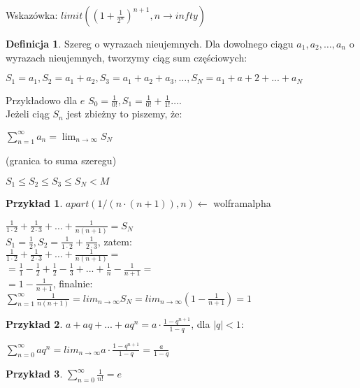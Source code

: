\documentclass{article}
\theoremstyle{definition}
\newtheorem{de}{Definicja}[subsection]
\theoremstyle{definition}
\theoremstyle{definition}
\newtheorem{pk}{Przykład}[subsection]
\theoremstyle{definition}
\begin{document}
Wskazówka: $limit\left((1+\frac{1}{2^n})^{n+1},n\rightarrow infty\right)$

\begin{de}
Szereg o wyrazach nieujemnych. Dla dowolnego ciągu $a_1, a_2, \dots, a_n$ o wyrazach nieujemnych,
tworzymy ciąg sum częściowych:
\begin{center}
$S_1=a_1, S_2=a_1+a_2, S_3=a_1+a_2+a_3, \dots, S_N=a_1+a+2+...+a_N$
\end{center}

Przykładowo dla $e$ $S_0=\frac{1}{0!}, S_1=\frac{1}{0!}+\frac{1}{1!}\dots$.\\
Jeżeli ciąg $S_n$ jest zbieżny to piszemy, że:
\begin{center}
$\sum_{n=1}^{\infty} a_n = \lim_{n\rightarrow \infty} S_N$
\end{center}
(granica to suma szeregu)
\begin{center}
    $S_1\leq S_2\leq S_3\leq S_N < M$
\end{center}
\end{de}

\begin{pk}
    $apart(1/(n\cdot(n+1)),n)\leftarrow$ wolframalpha
    \begin{center}
    $\frac{1}{1\cdot 2} + \frac{1}{2\cdot 3}+ \dots + \frac{1}{n(n+1)}=S_N$\\
    $S_1=\frac{1}{2}, S_2=\frac{1}{1\cdot 2}+\frac{1}{2\cdot 3}$, zatem:\\
    $\frac{1}{1\cdot 2} + \frac{1}{2\cdot 3}+ \dots + \frac{1}{n(n+1)}=$\\
    $=\frac{1}{1} - \frac{1}{2} + \frac{1}{2} - \frac{1}{3} + ... + \frac{1}{n} - \frac{1}{n+1}=$\\
    $=1-\frac{1}{n+1}$, finalnie:\\
    $\sum_{n=1}^{\infty} \frac{1}{n(n+1)} = lim_{n\rightarrow \infty} S_N = lim_{n\rightarrow \infty} (1 - \frac{1}{n+1}) = 1$
    \end{center}
\end{pk}

\begin{pk}
    $a+aq+...+aq^n=a\cdot \frac{1-q^{n+1}}{1-q}$, dla $|q|<1$:
    \begin{center}
    $\sum_{n=0}^{\infty} aq^n = lim_{n\rightarrow \infty} a\cdot \frac{1-q^{n+1}}{1-q} = \frac{a}{1-q}$
    \end{center}
\end{pk}

\begin{pk}
    $\sum_{n=0}^{\infty} \frac{1}{n!} = e$
\end{pk}
\end{document}
